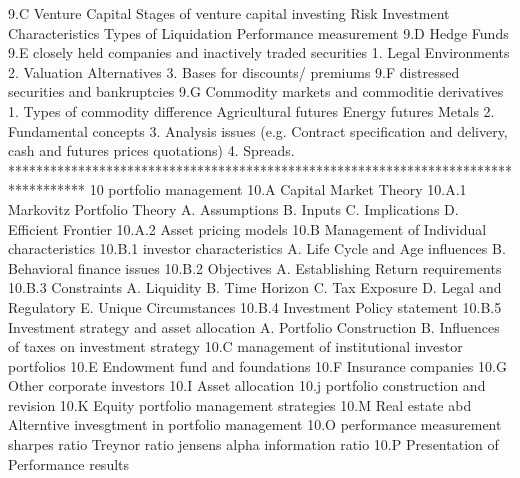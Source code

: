 9.C Venture Capital
	Stages of venture capital investing
	Risk
	Investment Characteristics
	Types of Liquidation
	Performance measurement	
9.D Hedge Funds
9.E closely held companies and inactively traded securities
	1. Legal Environments
	2. Valuation Alternatives
	3. Bases for discounts/ premiums 
9.F distressed securities and bankruptcies
9.G Commodity markets and commoditie derivatives
	1. Types of commodity difference
		Agricultural futures
		Energy futures
		Metals
	2. Fundamental concepts
	3. Analysis issues (e.g. Contract specification and delivery, cash and futures prices quotations)
	4. Spreads.
***********************************************************************************
10 portfolio management
10.A Capital Market Theory
	10.A.1 Markovitz Portfolio Theory
		A. Assumptions
		B. Inputs
		C. Implications
		D. Efficient Frontier
	10.A.2 Asset pricing models
10.B Management of Individual characteristics
	10.B.1 investor characteristics
		A. Life Cycle and Age influences
		B. Behavioral finance issues
	10.B.2 Objectives
		A. Establishing Return requirements
	10.B.3 Constraints
		A. Liquidity	
		B. Time Horizon
		C. Tax Exposure
		D. Legal and Regulatory
		E. Unique Circumstances
	10.B.4 Investment Policy statement
	10.B.5 Investment strategy and asset allocation
		A. Portfolio Construction
		B. Influences of taxes on investment strategy
10.C management of institutional investor portfolios
10.E Endowment fund and foundations
10.F Insurance companies
10.G Other corporate investors
10.I Asset allocation
10.j portfolio construction and revision
10.K Equity portfolio management strategies
10.M Real estate abd Alterntive invesgtment in portfolio management
10.O performance measurement
	sharpes ratio
	Treynor ratio
	jensens alpha
	information ratio
10.P Presentation of Performance results
